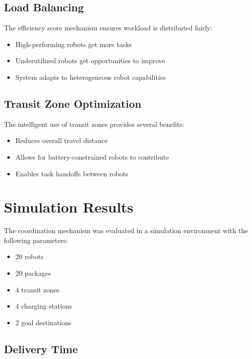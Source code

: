 \documentclass[12pt,a4paper]{article}
\begin{document}
\subsection{Load Balancing}

The efficiency score mechanism ensures workload is distributed fairly:

\begin{itemize}
    \item High-performing robots get more tasks
    \item Underutilized robots get opportunities to improve
    \item System adapts to heterogeneous robot capabilities
\end{itemize}

\subsection{Transit Zone Optimization}

The intelligent use of transit zones provides several benefits:

\begin{itemize}
    \item Reduces overall travel distance
    \item Allows for battery-constrained robots to contribute
    \item Enables task handoffs between robots
\end{itemize}

\section{Simulation Results}

The coordination mechanism was evaluated in a simulation environment with the following parameters:

\begin{itemize}
    \item 20 robots
    \item 20 packages
    \item 4 transit zones
    \item 4 charging stations
    \item 2 goal destinations
\end{itemize}

\subsection{Delivery Time}
\end{document}
